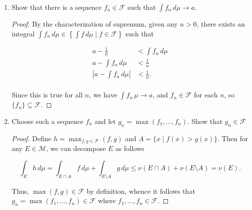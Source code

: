 \documentclass[11pt,oneside,english]{amsart}
\theoremstyle{definition}
\newcommand{\MC}[1]{\mathcal{#1}}
\begin{document}
\begin{enumerate}
\[
\MC{F}=\left\{f:X\rightarrow[0,\infty] \,\Big|\,f\text{ is measurable and }\int_Ef\,d\mu\leq \nu(E)\text{ for all } E\in\MC{M}\right\},
\]

and let $\displaystyle a=\sup\left\{\int f\,d\mu\mid f\in \MC{F}\right\}$. Note that since $a$ is the supremum of a possibly unbounded set of nonnegative numbers, we start out only knowing that $a\in[0,\infty]$. Show that $a<\infty$.

\begin{proof}
First, note that $\MC{F}$ is nonempty since $f\equiv 0\in\MC{F}$, so it makes sense to seek a supremum. Recall that $\nu$ is finite, i.e. $\nu(X)<\infty$. Since $X\in\MC{M}$, by the definition of $\MC{F}$, we have that $a\leq\nu(X)<\infty$
\end{proof}

\item Show that there is a sequence $f_n\in\MC{F}$ such that $\int f_n\,d\mu\rightarrow a$.

\begin{proof}
By the characterization of supremum, given any $n>0$, there exists an integral $\int f_n\,d\mu\in\left\{\int f\,d\mu\mid f\in \MC{F}\right\}$ such that

\begin{align*}
a-\frac{1}{n}&<\int f_n\,d\mu\\[2mm]
a-\int f_n\,d\mu&<\frac{1}{n}\\[2mm]
\left|a-\int f_n\,d\mu\right|&<\frac{1}{n}.\\[2mm]
\end{align*}

Since this is true for all $n$, we have $\int f_n\,\mu\rightarrow a$, and $f_n\in\MC{F}$ for each $n$, so $\{f_n\}\subseteq\MC{F}$.
\end{proof}

\item Choose such a sequence $f_n$ and let $g_n=\max(f_1,\ldots,f_n)$. Show that $g_n\in\MC{F}$%

\begin{proof}
Define $h=\max_{f,g\in\MC{F}}(f,g)$ and $A=\{x\mid f(x)>g(x)\}$. Then for any $E\in\MC{M}$, we can decompose $E$ as follows

\[
\int_E h\,d\mu=\int_{E\cap A}f\,d\mu+\int_{E\setminus A}g\,d\mu\leq\nu(E\cap A)+\nu(E\setminus A)=\nu(E).
\]

Thus, $\max(f,g)\in\MC{F}$ by definition, whence it follows that $g_n=\max(f_1,\ldots,f_n)\in\MC{F}$ where $f_1,\ldots,f_n\in\MC{F}$.
\end{proof}


\end{enumerate}
\end{document}
